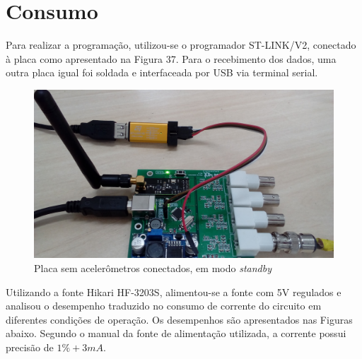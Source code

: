 \documentclass[
	12pt,				%
	openright,			%
	twoside,			%
	a4paper,			%
	english,			%
	french,				%
	spanish,			%
	brazil,				%
	]{abntex2}
\begin{document}
			\newpage

	\section{Consumo}
		Para realizar a programação, utilizou-se o programador
		ST-LINK/V2, conectado à placa como apresentado na Figura 37. Para
		o recebimento dos dados, uma outra placa igual foi soldada e
		interfaceada por USB via terminal serial.

		\begin{figure}[!ht]
			\centering
			\includegraphics[width=\linewidth]{../Fotos/stlink.jpg}
			\caption{Placa sem acelerômetros conectados, em modo \textit{standby}}
		\end{figure}

		Utilizando a fonte Hikari HF-3203S, alimentou-se a fonte com 5V
		regulados e analisou o desempenho traduzido no consumo de
		corrente do circuito em diferentes condições de operação. Os
		desempenhos são apresentados nas Figuras abaixo. Segundo o
		manual da fonte de alimentação utilizada, a corrente possui
		precisão de $1\% + 3mA$.
		
\end{document}
